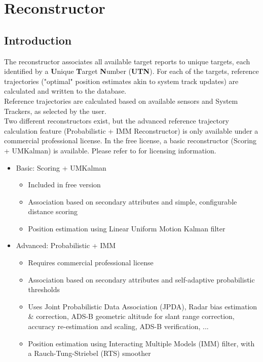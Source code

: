 \chapter{Reconstructor}
\label{sec:reconst} 

\section{Introduction}

The reconstructor associates all available target reports to unique targets, each identified by a \textbf{U}nique \textbf{T}arget \textbf{N}umber (\textbf{UTN}). For each of the targets, reference trajectories ("optimal" position estimates akin to system track updates) are calculated and written to the database. \\

Reference trajectories are calculated based on available sensors and System Trackers, as selected by the user. \\

Two different reconstructors exist, but the advanced reference trajectory calculation feature (Probabilistic + IMM Reconstructor) is only available under a commercial professional license. In the free license, a basic reconstructor (Scoring + UMKalman) is available. Please refer to  for licensing information. \\

\begin{itemize}  
   \item Basic: Scoring + UMKalman
   \begin{itemize}  
   \item Included in free version
   \item Association based on secondary attributes and simple, configurable distance scoring
   \item Position estimation using Linear Uniform Motion Kalman filter
   \end{itemize}  
   \item Advanced: Probabilistic + IMM
   \begin{itemize}  
   \item Requires commercial professional license
   \item Association based on secondary attributes and self-adaptive probabilistic thresholds
   \item Uses Joint Probabilistic Data Association (JPDA), Radar bias estimation \& correction, ADS-B geometric altitude for slant range correction, accuracy re-estimation and scaling, ADS-B verification, ...
   \item Position estimation using Interacting Multiple Models (IMM) filter, with a Rauch-Tung-Striebel (RTS) smoother
   \end{itemize}
\end{itemize}  

